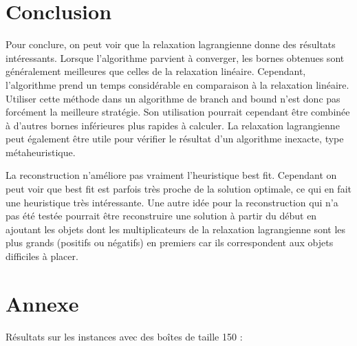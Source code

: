 \documentclass{article}
\begin{document}
\section{Conclusion}

Pour conclure, on peut voir que la relaxation lagrangienne donne des résultats intéressants.
Lorsque l'algorithme parvient à converger, les bornes obtenues sont généralement meilleures que celles de la relaxation linéaire.
Cependant, l'algorithme prend un temps considérable en comparaison à la relaxation linéaire.
Utiliser cette méthode dans un algorithme de branch and bound n'est donc pas forcément la meilleure stratégie. Son utilisation pourrait cependant être combinée à d'autres bornes inférieures plus rapides à calculer.
La relaxation lagrangienne peut également être utile pour vérifier le résultat d'un algorithme inexacte, type métaheuristique.\newline

La reconstruction n'améliore pas vraiment l'heuristique best fit.
Cependant on peut voir que best fit est parfois très proche de la solution optimale, ce qui en fait une heuristique très intéressante.
Une autre idée pour la reconstruction qui n'a pas été testée pourrait être reconstruire une solution à partir du début en ajoutant les objets dont les multiplicateurs de la relaxation lagrangienne sont les plus grands (positifs ou négatifs) en premiers car ils correspondent aux objets difficiles à placer.

\section{Annexe}

Résultats sur les instances avec des boîtes de taille 150 :\\
\end{document}

